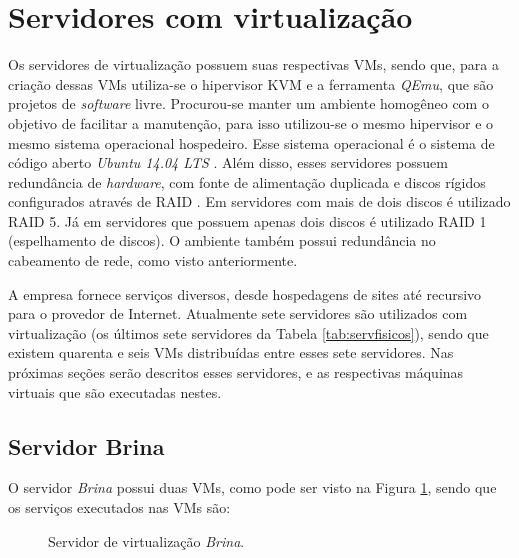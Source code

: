 \section{Servidores com virtualização}
\label{section:servvirt}

Os servidores de virtualização possuem suas respectivas \acp{VM}, sendo que, para a criação dessas \acp{VM} utiliza-se o hipervisor \ac{KVM} 
\cite{kvm} e a ferramenta \textit{QEmu}, que são projetos de \textit{software} livre. Procurou-se manter um ambiente homogêneo com o objetivo de 
facilitar a manutenção, para isso utilizou-se o mesmo hipervisor e o mesmo sistema operacional hospedeiro. Esse sistema operacional é o sistema 
de código aberto \textit{Ubuntu 14.04 \ac{LTS}} \cite{ubuntu}. Além disso, esses servidores possuem redundância de \textit{hardware}, com fonte 
de alimentação duplicada e discos rígidos configurados através de \ac{RAID} \cite{tanenbaum2009sistemas}. Em servidores com mais de dois discos é
utilizado \ac{RAID} 5. Já em servidores que possuem apenas dois discos é utilizado \ac{RAID} 1 (espelhamento de discos). 
O ambiente também possui redundância no cabeamento de rede, como visto anteriormente.

A empresa fornece serviços diversos, desde hospedagens de sites até  recursivo para o provedor de Internet. Atualmente sete servidores 
são utilizados com virtualização (os últimos sete servidores da Tabela \ref{tab:servfisicos}), sendo que existem quarenta e seis \acp{VM} 
distribuídas entre esses sete servidores. Nas próximas seções serão descritos esses servidores, e as respectivas máquinas virtuais que são
executadas nestes.

\subsection{Servidor Brina}
\label{section:serv_brina}

O servidor \textit{Brina} possui duas \acp{VM}, como pode ser visto na Figura \ref{fig:servidor_brina}, sendo que os serviços executados nas 
\acp{VM} são:

\begin{figure}[h!]
 \centering
 \caption{Servidor de virtualização \textit{Brina}.}
 \label{fig:servidor_brina}
\end{figure}

